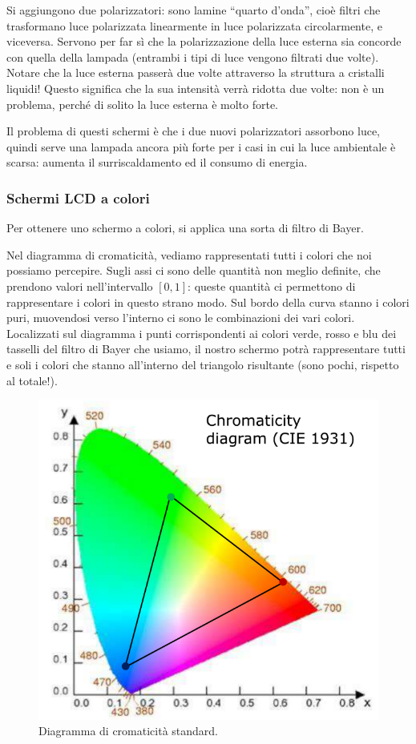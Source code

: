 \documentclass[a4paper,11pt]{article}
\begin{document}
Si aggiungono due polarizzatori: sono lamine ``quarto d'onda'', cioè filtri che trasformano luce polarizzata linearmente
in luce polarizzata circolarmente, e viceversa. Servono per far sì che la polarizzazione della luce esterna sia concorde con quella della
lampada (entrambi i tipi di luce vengono filtrati due volte). Notare che la luce esterna passerà due volte attraverso
la struttura a cristalli liquidi! Questo significa che la sua intensità verrà ridotta due volte: non è un problema, perché di solito la luce esterna è molto forte.
\par
Il problema di questi schermi è che i due nuovi polarizzatori assorbono luce, quindi serve una lampada ancora più
forte per i casi in cui la luce ambientale è scarsa: aumenta il surriscaldamento ed il consumo di energia.

\subsubsection{Schermi LCD a colori}
Per ottenere uno schermo a colori, si applica una sorta di filtro di Bayer.
\par
Nel diagramma di cromaticità, vediamo rappresentati tutti i colori che noi possiamo percepire. Sugli assi ci sono delle quantità
non meglio definite, che prendono valori nell'intervallo $[0, 1]$: queste quantità ci permettono di rappresentare
i colori in questo strano modo. Sul bordo della curva stanno i colori puri, muovendosi verso l'interno
ci sono le combinazioni dei vari colori. Localizzati sul diagramma i punti corrispondenti ai colori verde, rosso e blu dei
tasselli del filtro di Bayer che usiamo, il nostro schermo potrà rappresentare tutti e soli i colori che stanno all'interno del triangolo risultante (sono pochi, rispetto al totale!).

\renewcommand{\thefigure}{4.9}
\begin{figure}[!h]
  \centering
    \includegraphics[scale=0.4]{images/4/chromaticity.png}
    \caption{Diagramma di cromaticità standard.}
\end{figure}
\end{document}
